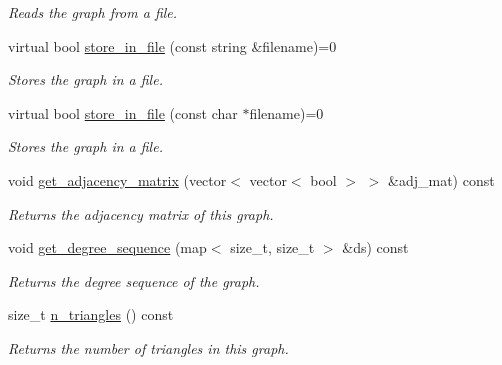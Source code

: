 \begin{DoxyCompactItemize}
\begin{DoxyCompactList}\small\item\em Reads the graph from a file. \end{DoxyCompactList}\item 
virtual bool \hyperlink{classlgraph_1_1utils_1_1xxgraph_aabf5361490305c1946d9084b1d9a026c}{store\+\_\+in\+\_\+file} (const string \&filename)=0\hypertarget{classlgraph_1_1utils_1_1xxgraph_aabf5361490305c1946d9084b1d9a026c}{}\label{classlgraph_1_1utils_1_1xxgraph_aabf5361490305c1946d9084b1d9a026c}

\begin{DoxyCompactList}\small\item\em Stores the graph in a file. \end{DoxyCompactList}\item 
virtual bool \hyperlink{classlgraph_1_1utils_1_1xxgraph_a5bb7620cd8721fc4b0d031230ab5c3b5}{store\+\_\+in\+\_\+file} (const char $\ast$filename)=0\hypertarget{classlgraph_1_1utils_1_1xxgraph_a5bb7620cd8721fc4b0d031230ab5c3b5}{}\label{classlgraph_1_1utils_1_1xxgraph_a5bb7620cd8721fc4b0d031230ab5c3b5}

\begin{DoxyCompactList}\small\item\em Stores the graph in a file. \end{DoxyCompactList}\item 
void \hyperlink{classlgraph_1_1utils_1_1xxgraph_a401454762f6b4b69f13ab0a10729c457}{get\+\_\+adjacency\+\_\+matrix} (vector$<$ vector$<$ bool $>$ $>$ \&adj\+\_\+mat) const \hypertarget{classlgraph_1_1utils_1_1xxgraph_a401454762f6b4b69f13ab0a10729c457}{}\label{classlgraph_1_1utils_1_1xxgraph_a401454762f6b4b69f13ab0a10729c457}

\begin{DoxyCompactList}\small\item\em Returns the adjacency matrix of this graph. \end{DoxyCompactList}\item 
void \hyperlink{classlgraph_1_1utils_1_1xxgraph_aff73f5ac4cd2732caa0c528eb1c1833c}{get\+\_\+degree\+\_\+sequence} (map$<$ size\+\_\+t, size\+\_\+t $>$ \&ds) const 
\begin{DoxyCompactList}\small\item\em Returns the degree sequence of the graph. \end{DoxyCompactList}\item 
size\+\_\+t \hyperlink{classlgraph_1_1utils_1_1xxgraph_ad4f25a8b29c6f26bc1567cb9c5a564ba}{n\+\_\+triangles} () const 
\begin{DoxyCompactList}\small\item\em Returns the number of triangles in this graph. \end{DoxyCompactList}\end{DoxyCompactItemize}
